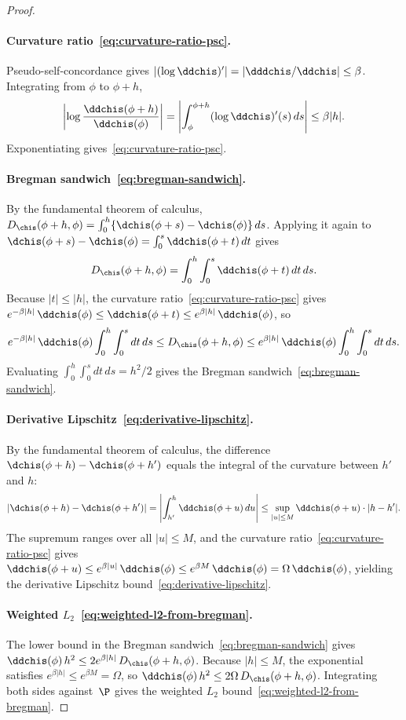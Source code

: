 \documentclass{article}
\begin{document}
\begin{proof}
\paragraph{Curvature ratio~\eqref{eq:curvature-ratio-psc}.}
Pseudo-self-concordance gives
$|(\log \ddchis)'| = |\dddchis/\ddchis| \le \beta$.
Integrating from $\phi$ to $\phi + h$,
\[
\abs{\log \frac{\ddchis(\phi + h)}{\ddchis(\phi)}}
  = \abs{\int_\phi^{\phi+h} (\log \ddchis)'(s)\, ds}
  \le \beta |h|.
\]
Exponentiating gives~\eqref{eq:curvature-ratio-psc}.

\paragraph{Bregman sandwich~\eqref{eq:bregman-sandwich}.}
By the fundamental theorem of calculus,
$D_{\chis}(\phi+h, \phi)
  = \int_0^h \{\dchis(\phi + s) - \dchis(\phi)\}\, ds$.
Applying it again to
$\dchis(\phi + s) - \dchis(\phi)
  = \int_0^s \ddchis(\phi + t)\, dt$
gives
\begin{equation}
\label{eq:bregman-ftc}
D_{\chis}(\phi+h, \phi)
  = \int_0^h \int_0^s \ddchis(\phi + t)\, dt\, ds.
\end{equation}
Because $|t| \le |h|$,
the curvature ratio~\eqref{eq:curvature-ratio-psc}
gives
$e^{-\beta|h|}\, \ddchis(\phi)
  \le \ddchis(\phi + t)
  \le e^{\beta|h|}\, \ddchis(\phi)$,
so
\[
e^{-\beta|h|}\, \ddchis(\phi)
  \int_0^h \int_0^s dt\, ds
\le D_{\chis}(\phi+h, \phi)
\le e^{\beta|h|}\, \ddchis(\phi)
  \int_0^h \int_0^s dt\, ds.
\]
Evaluating
$\int_0^h \int_0^s dt\, ds = h^2/2$
gives the Bregman sandwich~\eqref{eq:bregman-sandwich}.

\paragraph{Derivative Lipschitz~\eqref{eq:derivative-lipschitz}.}
By the fundamental theorem of calculus,
the difference $\dchis(\phi+h) - \dchis(\phi+h')$
equals the integral of the curvature between $h'$ and $h$:
\[
|\dchis(\phi+h) - \dchis(\phi+h')|
  = \abs{\int_{h'}^h \ddchis(\phi + u)\, du}
  \le \sup_{|u| \le M} \ddchis(\phi + u) \cdot |h - h'|.
\]
The supremum ranges over all $|u| \le M$,
and the curvature ratio~\eqref{eq:curvature-ratio-psc} gives
$\ddchis(\phi + u) \le e^{\beta|u|}\, \ddchis(\phi)
  \le e^{\beta M}\, \ddchis(\phi) = \Omega\, \ddchis(\phi)$,
yielding the derivative Lipschitz bound~\eqref{eq:derivative-lipschitz}.

\paragraph{Weighted $L_2$~\eqref{eq:weighted-l2-from-bregman}.}
The lower bound in the Bregman sandwich~\eqref{eq:bregman-sandwich}
gives
$\ddchis(\phi)\, h^2
  \le 2 e^{\beta|h|}\, D_{\chis}(\phi+h, \phi)$.
Because $|h| \le M$,
the exponential satisfies $e^{\beta|h|} \le e^{\beta M} = \Omega$,
so $\ddchis(\phi)\, h^2 \le 2\Omega\, D_{\chis}(\phi+h, \phi)$.
Integrating both sides against~$\P$ gives the weighted $L_2$ bound~\eqref{eq:weighted-l2-from-bregman}.


\end{proof}
\end{document}
